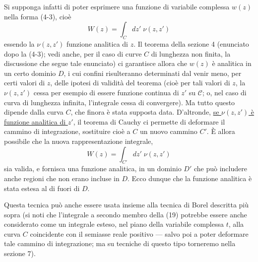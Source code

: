 \documentclass[11pt, a4paper]{book}
\numberwithin{equation}{section}
\begin{document}
Si supponga infatti di poter esprimere una funzione di variabile complessa $w(z)$ nella forma (4-3), cioè
\begin{equation}
W(z) = \int_C dz'\; \nu(z, z') \tag{20}
\end{equation}
essendo la $\nu(z,z')$ funzione analitica di $z$. Il teorema della sezione 4 (enunciato dopo la (4-3); vedi anche, per il caso di curve $C$ di lunghezza non finita, la discussione che segue tale enunciato) ci garantisce allora che $w(z)$ è analitica in un certo dominio $D$, i cui confini risulteranno determinati dal venir meno, per certi valori di $z$, delle ipotesi di validità del teorema (cioè per tali valori di $z$, la $\nu(z,z')$ cessa per esempio di essere funzione continua di $z'$ su $\mathcal{C}$; o, nel caso di curva di lunghezza infinita, l'integrale cessa di convergere). Ma tutto questo dipende dalla curva $C$, che finora è stata supposta data. D'altronde, \underline{se $\nu(z,z')$ è funzione analitica di $z'$}, il teorema di Cauchy ci permette di deformare il cammino di integrazione, sostituire cioè a $C$ un nuovo cammino $C'$. È allora possibile che la nuova rappresentazione integrale,
\begin{equation}
W(z) = \int_{C'} dz'\; \nu(z, z') \tag{21}
\end{equation}
sia valida, e fornisca una funzione analitica, in un dominio $D'$ che può includere anche regioni che non erano incluse in $D$. Ecco dunque che la funzione analitica è stata estesa al di fuori di $D$.

Questa tecnica può anche essere usata insieme alla tecnica di Borel descritta più sopra (si noti che l'integrale a secondo membro della (19) potrebbe essere anche considerato come un integrale esteso, nel piano della variabile complessa $t$, alla curva $C$ coincidente con il semiasse reale positivo — salvo poi a poter deformare tale cammino di integrazione; ma su tecniche di questo tipo torneremo nella sezione 7).
\end{document}
